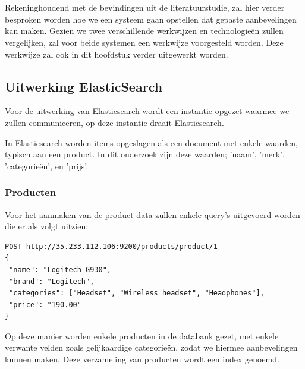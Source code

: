 

\chapter{}
\label{ch:methodologie}


Rekeninghoudend met de bevindingen uit de literatuurstudie, zal hier verder besproken worden hoe we een systeem gaan opstellen dat gepaste aanbevelingen kan maken. Gezien we twee verschillende werkwijzen en technologieën zullen vergelijken, zal voor beide systemen een werkwijze voorgesteld worden. Deze werkwijze zal ook in dit hoofdstuk verder uitgewerkt worden.

\section{Uitwerking ElasticSearch}
\label{sec:Uitwerking ElasticSearch}

Voor de uitwerking van Elasticsearch wordt een instantie opgezet waarmee we zullen communiceren, op deze instantie draait Elasticsearch. 

In Elasticsearch worden items opgeslagen als een document met enkele waarden, typisch aan een product. In dit onderzoek zijn deze waarden; 'naam', 'merk', 'categorieën', en 'prijs'. 

\subsection{Producten}
\label{sec:Producten}
Voor het aanmaken van de product data zullen enkele query's uitgevoerd worden die er als volgt uitzien:

\newpage
\begin{lstlisting}[caption={Query om één enkel product aan te maken},captionpos=b]
POST http://35.233.112.106:9200/products/product/1 
{ 
 "name": "Logitech G930",
 "brand": "Logitech",
 "categories": ["Headset", "Wireless headset", "Headphones"],
 "price": "190.00"
}
\end{lstlisting}

Op deze manier worden enkele producten in de databank gezet, met enkele verwante velden zoals gelijkaardige categorieën, zodat we hiermee aanbevelingen kunnen maken. Deze verzameling van producten wordt een index genoemd.

